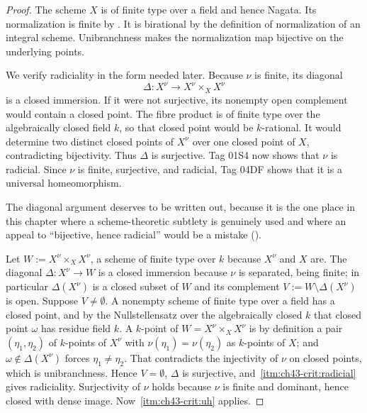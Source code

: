 \begin{proof}
The scheme $X$ is of finite type over a field and hence Nagata.
Its normalization is finite by
\cite[\href{https://stacks.math.columbia.edu/tag/035S}{Tag 035S}]
{stacks-project}.
It is birational by the definition of normalization of an integral scheme.
Unibranchness makes the normalization map bijective on the underlying
points.

We verify radiciality in the form needed later.
Because $\nu$ is finite, its diagonal
\[
       \Delta:X^\nu\longrightarrow X^\nu\times_X X^\nu
\]
is a closed immersion.
If it were not surjective, its nonempty open complement would contain a
closed point.
The fibre product is of finite type over the algebraically closed field
$k$, so that closed point would be $k$-rational.
It would determine two distinct closed points of $X^\nu$ over one closed
point of $X$, contradicting bijectivity.
Thus $\Delta$ is surjective.
Tag 01S4 now shows that $\nu$ is radicial.
Since $\nu$ is finite, surjective, and radicial, Tag 04DF shows that it is a
universal homeomorphism.

The diagonal argument deserves to be written out, because it is the one
place in this chapter where a scheme-theoretic subtlety is genuinely used
and where an appeal to ``bijective, hence radicial'' would be a mistake
().

Let $W:=X^\nu\times_XX^\nu$, a scheme of finite type over $k$ because
$X^\nu$ and $X$ are.  The diagonal
$\Delta:X^\nu\to W$ is a closed immersion because $\nu$ is separated,
being finite; in particular $\Delta(X^\nu)$ is a closed subset of $W$
and its complement $V:=W\setminus\Delta(X^\nu)$ is open.  Suppose
$V\ne\emptyset$.  A nonempty scheme of finite type over a field has a
closed point, and by the Nullstellensatz over the algebraically closed
$k$ that closed point $\omega$ has residue field $k$.  A $k$-point
of $W=X^\nu\times_XX^\nu$ is by definition a pair $(\eta_1,\eta_2)$ of
$k$-points of $X^\nu$ with $\nu(\eta_1)=\nu(\eta_2)$ as $k$-points
of $X$; and $\omega\notin\Delta(X^\nu)$ forces $\eta_1\ne\eta_2$.
That contradicts the injectivity of $\nu$ on closed points, which is
unibranchness.  Hence $V=\emptyset$, $\Delta$ is surjective, and
\,\cref{itm:ch43-crit:radicial} gives radiciality.
Surjectivity of $\nu$ holds because $\nu$ is finite and dominant, hence
closed with dense image.  Now
\,\cref{itm:ch43-crit:uh} applies.
\end{proof}

